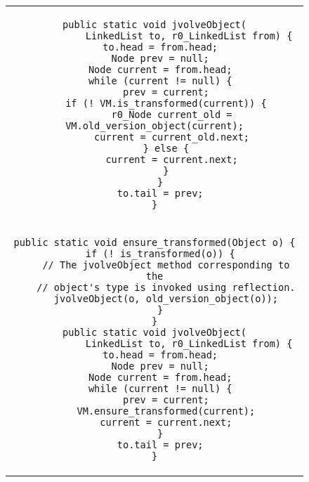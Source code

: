 \begin{figure}[p]
\lstset{frame=single}
\BC \begin{tabular}{@{}c@{}}
\begin{minipage}{0.9\textwidth}
\begin{lstlisting}[title={(a) Explicitly traversing old and new version objects}]
public static void jvolveObject(
            LinkedList to, r0_LinkedList from) {
  to.head = from.head;
  Node prev = null;
  Node current = from.head;
  while (current != null) {
    prev = current;
    if (! VM.is_transformed(current)) {
      r0_Node current_old = VM.old_version_object(current);
      current = current_old.next;
    } else {
      current = current.next;
    }
  }
  to.tail = prev;
}
\end{lstlisting}
\end{minipage} \\
\begin{minipage}{0.9\textwidth}
\begin{lstlisting}[title={(b) Explicitly transforming new version objects}]
public static void ensure_transformed(Object o) {
  if (! is_transformed(o)) {
    // The jvolveObject method corresponding to the
    // object's type is invoked using reflection.
    jvolveObject(o, old_version_object(o));
  }
}
public static void jvolveObject(
            LinkedList to, r0_LinkedList from) {
  to.head = from.head;
  Node prev = null;
  Node current = from.head;
  while (current != null) {
    prev = current;
    VM.ensure_transformed(current);
    current = current.next;
  }
  to.tail = prev;
}
\end{lstlisting}
\end{minipage}
\end{tabular}
\vspace*{-2.6ex}
\EC
\lstset{frame=none}
\VspaceFixForHangcaption
\end{figure}
